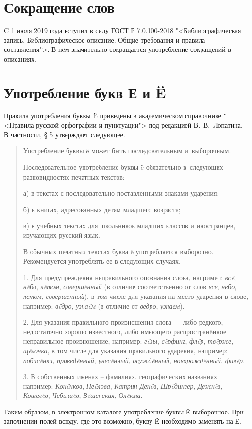 
\section{Сокращение слов}

C 1 июля 2019 года вступил в силу ГОСТ Р 7.0.100-2018 "<Библиографическая запись. Библиографическое описание. Общие требования и правила составления">. В н\"eм значительно сокращается употребление сокращений в описаниях. 


\section{Употребление букв Е и \"E}

Правила употребления буквы \"E приведены в академическом справочнике "<Правила русской орфографии и пунктуации"> под редакцией В.~В.~Лопатина. В частности, \S{} 5 утверждает следующее.

\begin{quotation}
    Употребление буквы \"e может быть последовательным и~выборочным.
    
    Последовательное употребление буквы \"e обязательно в~следующих разновидностях печатных текстов:
    
    а) в текстах с последовательно поставленными знаками ударения;
    
    б) в книгах, адресованных детям младшего возраста;
    
    в) в учебных текстах для школьников младших классов и иностранцев, изучающих русский язык.
    
    В обычных печатных текстах буква \"e употребляется выборочно. Рекомендуется употреблять ее в следующих случаях.
    
    1. Для предупреждения неправильного опознания слова, напримеп: \emph{вс\"e}, \emph{н\"eбо}, \emph{л\"eтом}, \emph{соверш\"eнный} (в отличие соответственно от слов \emph{все}, \emph{небо}, \emph{летом}, \emph{совершенный}), в том числе для указания на место ударения в слове, например: \emph{в\"eдро}, \emph{узна\"eм} (в отличие от \emph{ведро}, \emph{узнаем}).
    
    2. Для указания правильного произношения слова — либо редкого, недостаточно хорошо известного, либо имеющего распростран\"eнное неправильное произношение, например: \emph{г\"eзы}, \emph{с\"eрфинг}, \emph{фл\"eр}, \emph{тв\"eрже}, \emph{щ\"eлочка}, в том числе для указания правильного ударения, например: \emph{побас\"eнка}, \emph{привед\"eнный}, \emph{унес\"eнный}, \emph{осужд\"eнный}, \emph{новорожд\"eнный}, \emph{фил\"eр}.
    
    3. В собственных именах -- фамилиях, географических названиях, например: \emph{Кон\"eнков}, \emph{Не\"eлова}, \emph{Катрин Ден\"eв}, \emph{Шр\"eдингер}, \emph{Дежн\"eв}, \emph{Кошел\"eв}, \emph{Чебыш\"eв}, \emph{В\"eшенская}, \emph{Ол\"eкма}.
\end{quotation}

Таким образом, в электронном каталоге употребление буквы \"E выборочное. При заполнении полей всюду, где это возможно, букву \"E необходимо заменять на Е.